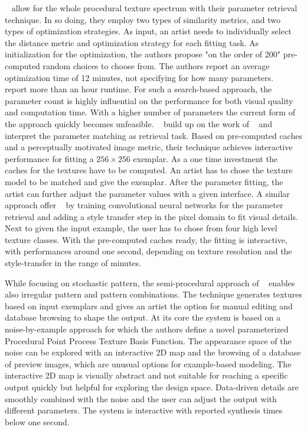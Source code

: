 \citeauthor*{bourque_2004_ptm}~\cite{bourque_2004_ptm} allow for the whole procedural texture spectrum with their parameter retrieval technique. In so doing, they employ two types of similarity metrics, and two types of optimization strategies. As input, an artist needs to individually select the distance metric and optimization strategy for each fitting task. As initialization for the optimization, the authors propose "on the order of 200" pre-computed random choices to choose from. The authors report an average optimization time of 12 minutes, not specifying for how many parameters. \citeauthor*{gilet_2012_mkn}~\cite{gilet_2012_mkn} report more than an hour runtime. For such a search-based approach, the parameter count is highly influential on the performance for both visual quality and computation time. With a higher number of parameters the current form of the approach quickly becomes unfeasible. \citeauthor*{gieseke_2014_ipr}~\cite{gieseke_2014_ipr} build up on the work of \citeauthor*{bourque_2004_ptm}~\cite{bourque_2004_ptm} and interpret the parameter matching as retrieval task. Based on pre-computed caches and a perceptually motivated image metric, their technique achieves interactive performance for fitting a $256\times256$ exemplar. As a one time investment the caches for the textures have to be computed. An artist has to chose the texture model to be matched and give the exemplar. After the parameter fitting, the artist can further adjust the parameter values with a given interface. A similar approach offer \citeauthor*{hu_2019_anf}~\cite{hu_2019_anf} by training convolutional neural networks for the parameter retrieval and adding a style transfer step in the pixel domain to fit visual details. Next to given the input example, the user has to chose from four high level texture classes. With the pre-computed caches ready, the fitting is interactive, with performances around one second, depending on texture resolution and the style-transfer in the range of minutes.

While focusing on stochastic pattern, the semi-procedural approach of \citeauthor*{guehl_2020_stu}~\cite{guehl_2020_stu} enables also irregular pattern and pattern combinations. The technique generates textures based on input exemplars and gives an artist the option for manual editing and database browsing to shape the output. At its core the system is based on a noise-by-example approach for which the authors define a novel parameterized Procedural Point Process Texture Basis Function. The appearance space of the noise can be explored with an interactive 2D map and the browsing of a database of preview images, which are unusual options for example-based modeling. The interactive 2D map is visually abstract and not suitable for reaching a specific output quickly but helpful for exploring the design space. Data-driven details are smoothly combined with the noise and the user can adjust the output with different parameters. The system is interactive with reported synthesis times below one second.



